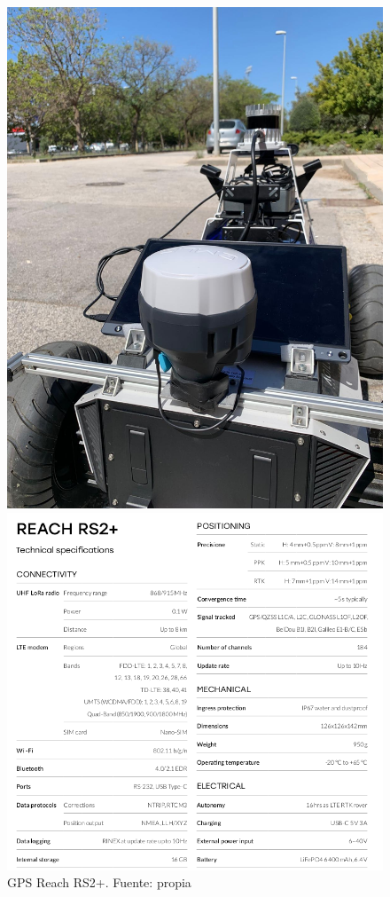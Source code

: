 \begin{figure}[htbp]
  \centering
  \begin{minipage}[b]{0.35\textwidth}
    \centering
    \includegraphics[width=\textwidth]{images/reach_rs2.jpeg}
    \caption{GPS Reach RS2+. Fuente: propia}
    \label{fig:reach_rs2}
  \end{minipage}
  \hfill
  \begin{minipage}[b]{0.5\textwidth}
    \centering
    \includegraphics[width=\textwidth]{images/reach_datasheet.png}

\end{minipage}
\end{figure}
